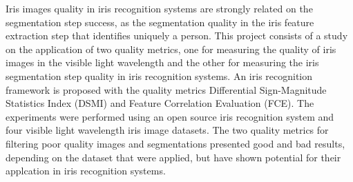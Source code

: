 Iris images quality in iris recognition systems are strongly related on the segmentation step success, as the segmentation quality in the iris feature extraction step that identifies uniquely a person. This project consists of a study on the application of two quality metrics, one for measuring the quality of iris images in the visible light wavelength and the other for measuring the iris segmentation step quality in iris recognition systems. An iris recognition framework is proposed with the quality metrics Differential Sign-Magnitude Statistics Index (DSMI) and Feature Correlation Evaluation (FCE). The experiments were performed using an open source iris recognition system and four visible light wavelength iris image datasets. The two quality metrics for filtering poor quality images and segmentations presented good and bad results, depending on the dataset that were applied, but have shown potential for their applcation in iris recognition systems.